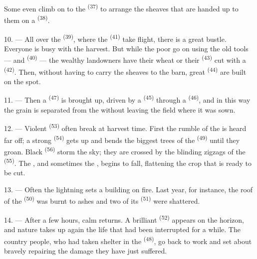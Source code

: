 Some even climb on to the  \textsuperscript{(37)} to arrange the
sheaves that are handed up to them on a  \textsuperscript{(38)}.

10. --- All over the  \textsuperscript{(39)}, where the 
\textsuperscript{(41)} take flight, there is a great bustle. Everyone is busy
with the harvest. But while the poor go on using the old tools ---
 and  \textsuperscript{(40)} --- the
wealthy landowners have their wheat or their  \textsuperscript{(43)} cut
with a  \textsuperscript{(42)}. Then, without having to
carry the sheaves to the barn, great  \textsuperscript{(44)} are built
on the spot.

11. --- Then a  \textsuperscript{(47)} is brought up,
driven by a  \textsuperscript{(45)} through a
 \textsuperscript{(46)}, and in this way the grain is
separated from the  without leaving the field where it was
sown.

\VUsaut{5.0mm}
\VUsaut{3.4mm}

12. --- Violent  \textsuperscript{(53)} often break at harvest time.
First the rumble of the  is heard far off; a strong
 \textsuperscript{(54)} gets up and bends the biggest trees of the
 \textsuperscript{(49)} until they groan. Black 
\textsuperscript{(56)} storm the sky; they are crossed by the blinding zigzags of
the  \textsuperscript{(55)}. The , and sometimes the
, begins to fall, flattening the crop that is ready to be cut.

13. --- Often the lightning sets a building on fire. Last year, for
instance, the roof of the  \textsuperscript{(50)} was burnt to
ashes and two of its  \textsuperscript{(51)} were shattered.

14. --- After a few hours, calm returns. A brilliant 
\textsuperscript{(52)} appears on the horizon, and nature takes up again the life
that had been interrupted for a while. The country people, who had taken
shelter in the  \textsuperscript{(48)}, go back to work and set about
bravely repairing the damage they have just suffered.

